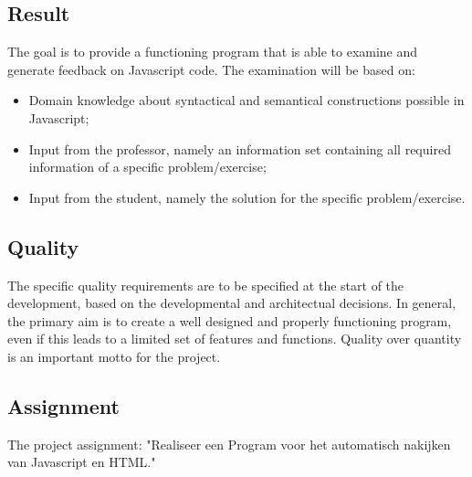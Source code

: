 \documentclass{article}
\begin{document}
\subsection{Result}

The goal is to provide a functioning program that is able to examine and generate feedback on Javascript code. The examination will be based on:

\begin{itemize}
  \item Domain knowledge about syntactical and semantical constructions possible in Javascript;
  \item Input from the professor, namely an information set containing all required information of a specific problem/exercise;
  \item Input from the student, namely the solution for the specific problem/exercise.
\end{itemize}

\subsection{Quality}

The specific quality requirements are to be specified at the start of the development, based on the developmental and architectual decisions. In general, the primary aim is to create a well designed and properly functioning program, even if this leads to a limited set of features and functions. Quality over quantity is an important motto for the project.

\subsection{Assignment}

The project assignment: "Realiseer een Program voor het automatisch nakijken van Javascript en HTML."
\end{document}
